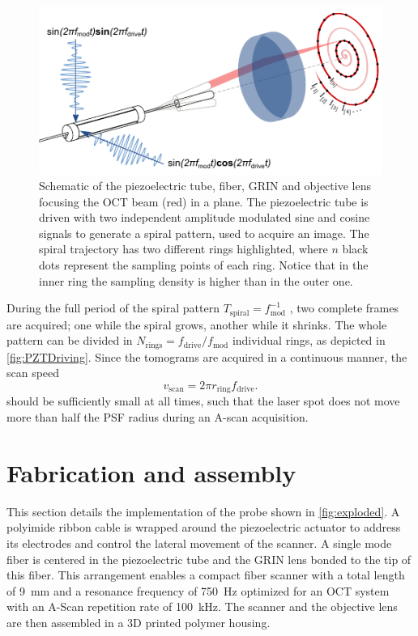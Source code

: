 \documentclass[10pt]{iopart}
\begin{document}
\begin{figure}[h!]\centering \includegraphics[width=\columnwidth]{figures/PZTDrivingMoving.pdf}
      \caption{Schematic of the piezoelectric tube, fiber, GRIN and objective lens focusing the OCT beam (red) in a plane. 
      The piezoelectric tube is driven with two independent amplitude modulated sine and cosine signals to generate a spiral pattern, used to acquire an image. The spiral trajectory has two different rings highlighted, where $n$ black dots represent the sampling points of each ring. Notice that in the inner ring the sampling density is higher than in the outer one.    }
      \label{fig:PZTDriving}
\end{figure}

During the full period of the spiral pattern $T_\mathrm{spiral}=f_\mathrm{mod}^{-1}$ , two complete frames are acquired; one while the spiral grows, another while it shrinks. The whole pattern can be divided in $N_\mathrm{rings} = f_\mathrm{drive}/f_\mathrm{mod}$ individual rings, as depicted in \autoref{fig:PZTDriving}. Since the tomograms are acquired in a continuous manner, the scan speed 
\begin{equation}
	v_\mathrm{scan} = 2 \pi r_\mathrm{ring} f_\mathrm{drive}.
\end{equation}
should be sufficiently small at all times, such that the laser spot does not move more than half the PSF radius during an A-scan acquisition. 

\section{Fabrication and assembly} \label{sec:fab}
This section details the implementation of the probe shown in \autoref{fig:exploded}. A polyimide ribbon cable is wrapped around the piezoelectric actuator to address its electrodes and control the lateral movement of the scanner. A single mode fiber is centered in the piezoelectric tube and the GRIN lens bonded to the tip of this fiber. This arrangement enables a compact fiber scanner with a total length of \SI{9}{\milli\meter} and a resonance frequency of \SI{750}{\hertz} optimized for an OCT system with an A-Scan repetition rate of \SI{100}{\kilo\hertz}. The scanner and the objective lens are then assembled in a 3D printed polymer housing.
\end{document}
